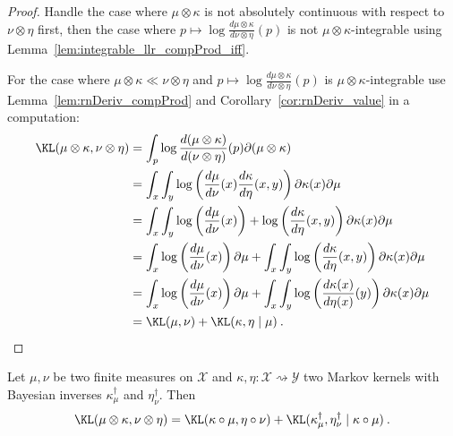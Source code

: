 \begin{proof} \leanok
{}
Handle the case where $\mu \otimes \kappa$ is not absolutely continuous with respect to  $\nu \otimes \eta$ first, then the case where $p \mapsto \log \frac{d \mu \otimes \kappa}{d \nu \otimes \eta}(p)$ is not $\mu \otimes \kappa$-integrable using Lemma~\ref{lem:integrable_llr_compProd_iff}.

For the case where $\mu \otimes \kappa \ll \nu \otimes \eta$ and $p \mapsto \log \frac{d \mu \otimes \kappa}{d \nu \otimes \eta}(p)$ is $\mu \otimes \kappa$-integrable use Lemma~\ref{lem:rnDeriv_compProd} and Corollary~\ref{cor:rnDeriv_value} in a computation:
\begin{align*}
\KL(\mu \otimes \kappa, \nu \otimes \eta)
&= \int_p \log \frac{d(\mu \otimes \kappa)}{d(\nu \otimes \eta)}(p) \partial (\mu \otimes \kappa)
\\
&= \int_x \int_y\log \left(\frac{d\mu}{d \nu}(x)\frac{d\kappa}{d \eta}(x,y)\right) \partial \kappa(x) \partial\mu
\\
&= \int_x \int_y\log \left(\frac{d\mu}{d \nu}(x)\right) + \log \left(\frac{d\kappa}{d \eta}(x,y)\right) \partial \kappa(x) \partial\mu
\\
&= \int_x \log \left(\frac{d\mu}{d \nu}(x)\right)\partial\mu + \int_x \int_y\log \left(\frac{d\kappa}{d \eta}(x,y)\right) \partial \kappa(x) \partial\mu
\\
&= \int_x \log \left(\frac{d\mu}{d \nu}(x)\right)\partial\mu + \int_x \int_y\log \left(\frac{d\kappa(x)}{d \eta(x)}(y)\right) \partial \kappa(x) \partial\mu
\\
&= \KL(\mu, \nu) + \KL(\kappa, \eta \mid \mu)
\: .
\end{align*}

\end{proof}


\begin{theorem}
  \label{thm:kl_compProd_bayesInv}
  Let $\mu, \nu$ be two finite measures on $\mathcal X$ and $\kappa, \eta : \mathcal X \rightsquigarrow \mathcal Y$ two Markov kernels with Bayesian inverses $\kappa_\mu^\dagger$ and $\eta_\nu^\dagger$.
  Then 
  \begin{align*}
  \KL(\mu \otimes \kappa, \nu \otimes \eta) = \KL(\kappa \circ \mu, \eta \circ \nu) + \KL(\kappa_\mu^\dagger, \eta_\nu^\dagger \mid \kappa \circ \mu)
  \: .
  \end{align*}
\end{theorem}

